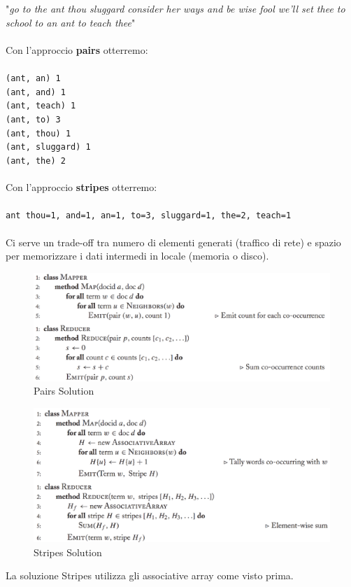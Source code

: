 \documentclass{article}
\begin{document}
\begin{appendices}
"\textit{go to the ant thou sluggard consider her ways and be wise
fool we'll set thee to school to an ant to teach thee}"\\ \\
Con l'approccio \textbf{pairs} otterremo:\\ \\
    \texttt{(ant, an)       1\\
    (ant, and)      1\\
    (ant, teach)    1\\
    (ant, to)       3\\
    (ant, thou)     1\\
    (ant, sluggard) 1\\
    (ant, the)      2}\\ \\
Con l'approccio \textbf{stripes} otterremo:\\ \\
\texttt{ant     {thou=1, and=1, an=1, to=3, sluggard=1, the=2, teach=1}}\\ \\
Ci serve un trade-off tra numero di elementi generati (traffico di rete) e spazio per memorizzare i dati intermedi in locale (memoria o disco).
\begin{figure}[H]
    \centering
    \includegraphics[scale=0.5]{img/Pairs.PNG}
    \caption{Pairs Solution}
\end{figure}
\begin{figure}[H]
    \centering
    \includegraphics[scale=0.5]{img/Stripes.PNG}
    \caption{Stripes Solution}
\end{figure}
La soluzione Stripes utilizza gli associative array come visto prima.


\end{appendices}
\end{document}

